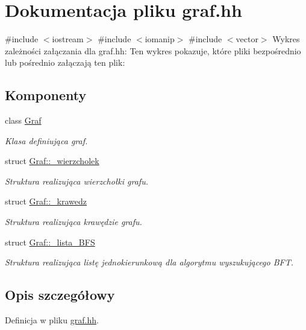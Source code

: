\hypertarget{graf_8hh}{\section{\-Dokumentacja pliku graf.\-hh}
\label{graf_8hh}
}
{\ttfamily \#include $<$iostream$>$}\*
{\ttfamily \#include $<$iomanip$>$}\*
{\ttfamily \#include $<$vector$>$}\*
\-Wykres zależności załączania dla graf.\-hh\-:
\-Ten wykres pokazuje, które pliki bezpośrednio lub pośrednio załączają ten plik\-:
\subsection*{\-Komponenty}
\begin{DoxyCompactItemize}
\item 
class \hyperlink{class_graf}{\-Graf}
\begin{DoxyCompactList}\small\item\em \-Klasa definiująca graf. \end{DoxyCompactList}\item 
struct \hyperlink{struct_graf_1_1__wierzcholek}{\-Graf\-::\-\_\-wierzcholek}
\begin{DoxyCompactList}\small\item\em \-Struktura realizująca wierzchołki grafu. \end{DoxyCompactList}\item 
struct \hyperlink{struct_graf_1_1__krawedz}{\-Graf\-::\-\_\-krawedz}
\begin{DoxyCompactList}\small\item\em \-Struktura realizująca krawędzie grafu. \end{DoxyCompactList}\item 
struct \hyperlink{struct_graf_1_1__lista___b_f_s}{\-Graf\-::\-\_\-lista\-\_\-\-B\-F\-S}
\begin{DoxyCompactList}\small\item\em \-Struktura realizująca listę jednokierunkową dla algorytmu wyszukującego \-B\-F\-T. \end{DoxyCompactList}\end{DoxyCompactItemize}


\subsection{\-Opis szczegółowy}


\-Definicja w pliku \hyperlink{graf_8hh_source}{graf.\-hh}.

